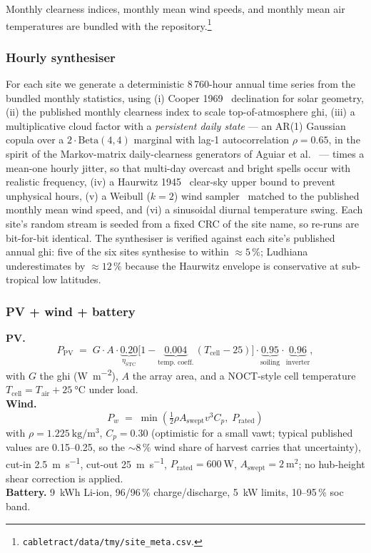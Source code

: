\documentclass[11pt,a4paper]{article}
\begin{document}
Monthly clearness indices, monthly mean wind speeds, and monthly mean air temperatures are bundled with the repository.\footnote{\texttt{cabletract/data/tmy/site\_meta.csv}.}

\subsubsection{Hourly synthesiser}\label{sec:synth}

For each site we generate a deterministic 8\,760-hour annual time series from the bundled monthly statistics, using (i) Cooper 1969~\cite{cooper1969absorption} declination for solar geometry, (ii) the published monthly clearness index to scale top-of-atmosphere \gls{ghi}, (iii) a multiplicative cloud factor with a \emph{persistent daily state} --- an AR(1) Gaussian copula over a $2\cdot\mathrm{Beta}(4,4)$ marginal with lag-1 autocorrelation $\rho = 0.65$, in the spirit of the Markov-matrix daily-clearness generators of Aguiar et al.~\cite{aguiar1988markov} --- times a mean-one hourly jitter, so that multi-day overcast and bright spells occur with realistic frequency, (iv) a Haurwitz 1945~\cite{haurwitz1945insolation} clear-sky upper bound to prevent unphysical hours, (v) a Weibull ($k=2$) wind sampler~\cite{justus1978winds} matched to the published monthly mean wind speed, and (vi) a sinusoidal diurnal temperature swing. Each site's random stream is seeded from a fixed CRC of the site name, so re-runs are bit-for-bit identical. The synthesiser is verified against each site's published annual \gls{ghi}: five of the six sites synthesise to within ${\approx}5\,\%$; Ludhiana underestimates by ${\approx}12\,\%$ because the Haurwitz envelope is conservative at sub-tropical low latitudes.

\subsubsection{PV + wind + battery}\label{sec:pvwindbat}

\textbf{PV.} \[ P_{\text{PV}} \;=\; G \cdot A \cdot \underbrace{0.20}_{\eta_{\text{STC}}}\!\bigl[1 - \underbrace{0.004}_{\text{temp.\ coeff.}}\,(T_{\text{cell}} - 25)\bigr] \cdot \underbrace{0.95}_{\text{soiling}} \cdot \underbrace{0.96}_{\text{inverter}}, \]
with $G$ the \gls{ghi} (\si{\watt\per\meter\squared}), $A$ the array area, and a NOCT-style cell temperature $T_{\text{cell}} = T_{\text{air}} + \SI{25}{\celsius}$ under load.\\
\textbf{Wind.} \[ P_w \;=\; \min\!\left(\tfrac{1}{2}\rho A_{\text{swept}} v^{3} C_p,\; P_{\text{rated}}\right) \] with $\rho = \SI{1.225}{\kilogram\per\meter\cubed}$, $C_p = 0.30$ (optimistic for a small \gls{vawt}; typical published values are 0.15--0.25, so the ${\sim}8\,\%$ wind share of harvest carries that uncertainty), cut-in \SI{2.5}{\meter\per\second}, cut-out \SI{25}{\meter\per\second}, $P_{\text{rated}} = \SI{600}{\watt}$, $A_{\text{swept}} = \SI{2}{\meter\squared}$; no hub-height shear correction is applied.\\
\textbf{Battery.} \SI{9}{\kWh} Li-ion, 96/96\,\% charge/discharge, \SI{5}{\kilo\watt} limits, 10--95\,\% \gls{soc} band.
\end{document}
